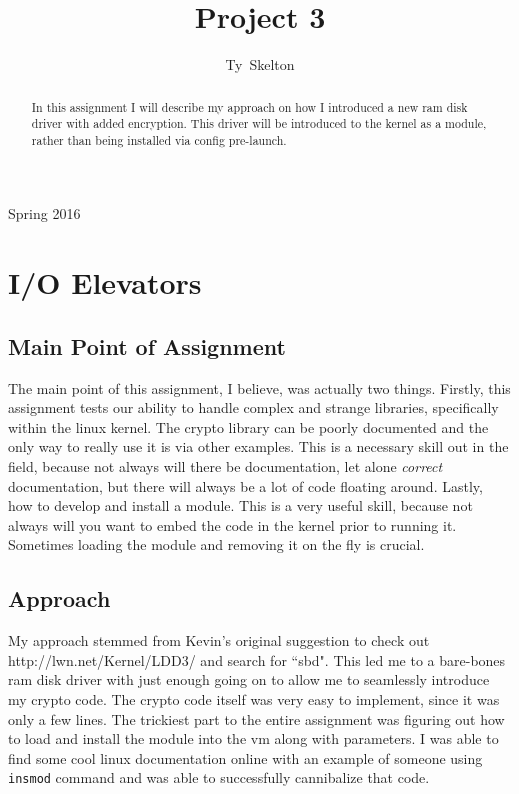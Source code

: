 \documentclass[10pt,draftclsnofoot,onecolumn]{IEEEtran}
\begin{document}
\singlespacing
\title{Project 3}

\author{Ty~Skelton}

%
{Spring 2016}

\maketitle

\begin{abstract}
In this assignment I will describe my approach on how I introduced a new ram disk driver with added encryption.
This driver will be introduced to the kernel as a module, rather than being installed via config pre-launch.

\end{abstract}
\IEEEpeerreviewmaketitle

\newpage
{}

\tableofcontents
\newpage


\section{I/O Elevators}
\subsection{Main Point of Assignment}
The main point of this assignment, I believe, was actually two things.
Firstly, this assignment tests our ability to handle complex and strange libraries, specifically within the linux kernel.
The crypto library can be poorly documented and the only way to really use it is via other examples.
This is a necessary skill out in the field, because not always will there be documentation, let alone \textit{correct} documentation, but there will always be a lot of code floating around.
Lastly, how to develop and install a module.
This is a very useful skill, because not always will you want to embed the code in the kernel prior to running it.
Sometimes loading the module and removing it on the fly is crucial.

\subsection{Approach}
My approach stemmed from Kevin's original suggestion to check out http://lwn.net/Kernel/LDD3/ and search for ``sbd".
This led me to a bare-bones ram disk driver with just enough going on to allow me to seamlessly introduce my crypto code.
The crypto code itself was very easy to implement, since it was only a few lines.
The trickiest part to the entire assignment was figuring out how to load and install the module into the vm along with parameters.
I was able to find some cool linux documentation online with an example of someone using \texttt{insmod} command and was able to successfully cannibalize that code.
\end{document}

